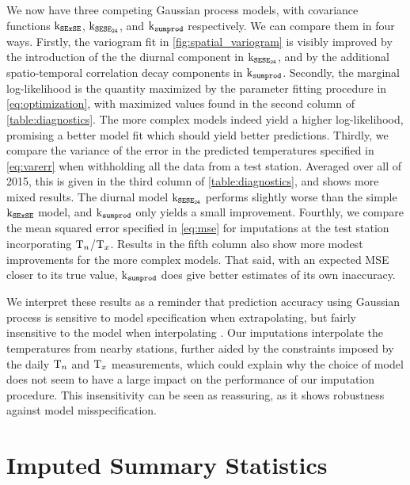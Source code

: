 \documentclass[12pt]{article}
\begin{document}
We now have three competing Gaussian process models, with covariance functions \(\operatorname{k_{\mathtt{SExSE}}}\), \(\operatorname{k_{\mathtt{SESE_{24}}}}\), and \(\operatorname{k_{\mathtt{sumprod}}}\) respectively. 
We can compare them in four ways.
Firstly, the variogram fit in \autoref{fig:spatial_variogram} is visibly improved by the introduction of the the diurnal component in \(\operatorname{k_{\mathtt{SESE_{24}}}}\), and by the additional spatio-temporal correlation decay components in \(\operatorname{k_{\mathtt{sumprod}}}\).
Secondly, the marginal log-likelihood is the quantity maximized by the parameter fitting procedure in \autoref{eq:optimization}, with maximized values found in the second column of \autoref{table:diagnostics}.
The more complex models indeed yield a higher log-likelihood, promising a better model fit which should yield better predictions.
Thirdly, we compare the variance of the error in the predicted temperatures specified in \autoref{eq:varerr} when withholding all the data from a test station. 
Averaged over all of 2015, this is given in the third column of \autoref{table:diagnostics}, and shows more mixed results.
The diurnal model \(\operatorname{k_{\mathtt{SESE_{24}}}}\) performs slightly worse than the simple \(\operatorname{k_{\mathtt{SExSE}}}\) model, and \(\operatorname{k_{\mathtt{sumprod}}}\) only yields a small improvement.
Fourthly, we compare the mean squared error specified in \autoref{eq:mse} for imputations at the test station incorporating \(\mathrm{T}_{n}\)/\(\mathrm{T}_{x}\). 
Results in the fifth column also show more modest improvements for the more complex models.
That said, with an expected MSE closer to its true value, \(\operatorname{k_{\mathtt{sumprod}}}\) does give better estimates of its own inaccuracy.

We interpret these results as a reminder that prediction accuracy using Gaussian process is sensitive to model specification when extrapolating, but fairly insensitive to the model when interpolating \citep{stein2012interpolation}.
Our imputations interpolate the temperatures from nearby stations, further aided by the constraints imposed by the daily \(\mathrm{T}_{n}\) and \(\mathrm{T}_{x}\) measurements, which could explain why the choice of model does not seem to have a large impact on the performance of our imputation procedure.
This insensitivity can be seen as reassuring, as it shows robustness against model misspecification.

\section{Imputed Summary Statistics}
\end{document}
